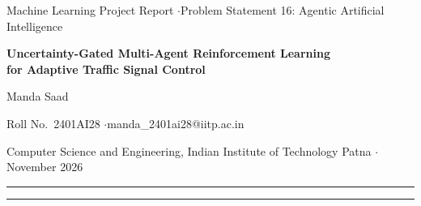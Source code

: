 \documentclass[10pt,a4paper,oneside]{report}
\begin{document}
\begin{center}
{\small Machine Learning Project Report \quad$\cdot$\quad Problem Statement 16: Agentic Artificial Intelligence\par}
\vspace{6pt}
{\LARGE\bfseries Uncertainty-Gated Multi-Agent Reinforcement Learning\\[2pt]
for Adaptive Traffic Signal Control\par}
\vspace{8pt}
{\large Manda Saad\par}
\vspace{2pt}
{\small Roll No.\ 2401AI28 \quad$\cdot$\quad manda\_2401ai28@iitp.ac.in\par}
{\small Computer Science and Engineering, Indian Institute of Technology Patna \quad$\cdot$\quad November 2026\par}
\end{center}
\vspace{4pt}
\hrule
\vspace{6pt}



\begingroup
\let\clearpage\relax
\let\cleardoublepage\relax
\tableofcontents
\vspace{8pt}
\listoffigures
\vspace{8pt}
\listoftables
\endgroup
\vspace{6pt}
\hrule







{}
\begingroup
\footnotesize
\setlength{\bibsep}{0.5pt plus 0.3pt}


\endgroup

\appendix

    
\end{document}
